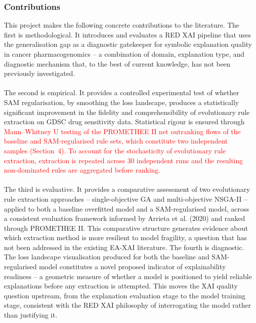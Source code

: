\subsubsection{Contributions}

This project makes the following concrete contributions to the literature.
The first is methodological. It introduces and evaluates a RED XAI pipeline that uses the generalisation gap as 
a diagnostic gatekeeper for symbolic explanation quality in cancer pharmacogenomics – a combination of domain, 
explanation type, and diagnostic mechanism that, to the best of current knowledge, has not been previously 
investigated. 
\\\\
The second is empirical. It provides a controlled experimental test of whether SAM regularisation, by smoothing 
the loss landscape, produces a statistically significant improvement in the fidelity and comprehensibility of 
evolutionary rule extraction on GDSC drug sensitivity data. Statistical rigour is ensured through \textcolor{red}{Mann--Whitney U testing of the PROMETHEE II net
outranking flows of the baseline and SAM-regularised rule sets, which constitute two independent
samples (Section~4). To account for the stochasticity of evolutionary rule extraction, extraction is
repeated across 30 independent runs and the resulting non-dominated rules are aggregated before
ranking.}
\\\\
The third is evaluative. It provides a comparative assessment of two evolutionary rule extraction approaches – 
single-objective GA and multi-objective NSGA-II – applied to both a baseline overfitted model and a 
SAM-regularised model, across a consistent evaluation framework informed by Arrieta et al. (2020) and ranked 
through PROMETHEE II. This comparative structure generates evidence about which extraction method is more 
resilient to model fragility, a question that has not been addressed in the existing EA-XAI literature.
The fourth is diagnostic. The loss landscape visualisation produced for both the baseline and SAM-regularised 
model constitutes a novel proposed indicator of explainability readiness – a geometric measure of whether a 
model is positioned to yield reliable explanations before any extraction is attempted. This moves the XAI 
quality question upstream, from the explanation evaluation stage to the model training stage, consistent with 
the RED XAI philosophy of interrogating the model rather than justifying it.
